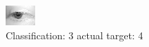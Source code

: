 \begin{figure}[h!]
\begin{center}
\includegraphics[width=0.60\columnwidth]{figures/ID2632_class_3_target_4.png}
\end{center}
\caption{ Classification: 3 actual target: 4}
\label{fig:ID2632_class_3_target_4}
\end{figure}
